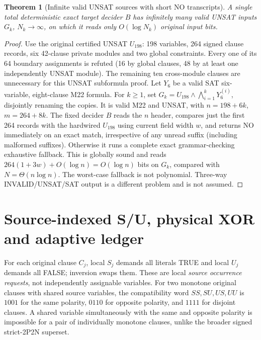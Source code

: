 \documentclass[11pt]{article}
\newtheorem{theorem}{Theorem}
\begin{document}
\begin{theorem}[Infinite valid UNSAT sources with short NO transcripts]\label{nofloor}
A single total deterministic exact target decider \(B\) has infinitely many valid UNSAT inputs \(G_k\), \(N_k\to\infty\), on which it reads only \(O(\log N_k)\) original input bits.
\end{theorem}
\begin{proof}
Use the original certified UNSAT \(U_{198}\): 198 variables, 264 signed clause records, six 42-clause private modules and two global constraints. Every one of its 64 boundary assignments is refuted (16 by global clauses, 48 by at least one independently UNSAT module). The remaining ten cross-module clauses are unnecessary for this UNSAT subformula proof. Let \(Y_6\) be a valid SAT six-variable, eight-clause M22 formula. For \(k\ge1\), set \(G_k=U_{198}\wedge\bigwedge_{i=1}^k Y_6^{(i)}\), disjointly renaming the copies. It is valid M22 and UNSAT, with \(n=198+6k\), \(m=264+8k\). The fixed decider \(B\) reads the \(n\) header, compares just the first 264 records with the hardwired \(U_{198}\) using current field width \(w\), and returns NO immediately on an exact match, irrespective of any unread suffix (including malformed suffixes). Otherwise it runs a complete exact grammar-checking exhaustive fallback. This is globally sound and reads \(264(1+3w)+O(\log n)=O(\log n)\) bits on \(G_k\), compared with \(N=\Theta(n\log n)\). The worst-case fallback is not polynomial. Three-way INVALID/UNSAT/SAT output is a different problem and is not assumed.
\end{proof}

\section{Source-indexed S/U, physical XOR and adaptive ledger}
For each original clause \(C_j\), local \(S_j\) demands all literals TRUE and local \(U_j\) demands all FALSE; inversion swaps them. These are local \emph{source occurrence requests}, not independently assignable variables. For two monotone original clauses with shared source variables, the compatibility word \(SS,SU,US,UU\) is \(1001\) for the same polarity, \(0110\) for opposite polarity, and \(1111\) for disjoint clauses. A shared variable simultaneously with the same and opposite polarity is impossible for a pair of individually monotone clauses, unlike the broader signed strict-2P2N superset.
\end{document}
